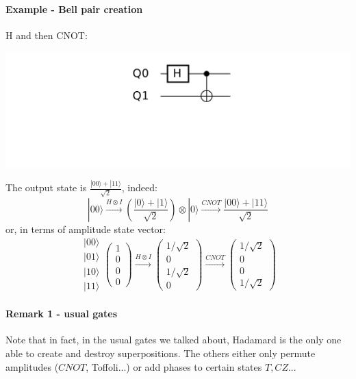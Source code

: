 \documentclass{article}
\begin{document}
\paragraph{Example - Bell pair creation} H and then CNOT:
\begin{center}
    \includegraphics[width=\textwidth]{bell_pair_creation.pdf}
\end{center}
The output state is $\frac{|00\rangle+|11\rangle}{\sqrt{2}}$, indeed:
$$|00\rangle \xrightarrow[]{H\otimes I} \left(\frac{|0\rangle+|1\rangle}{\sqrt{2}}\right)\otimes |0\rangle 
\xrightarrow[]{CNOT}\frac{|00\rangle+|11\rangle}{\sqrt{2}}$$
or, in terms of amplitude state vector:
$$ \begin{matrix}
|00\rangle \\ |01\rangle \\ |10\rangle \\ |11\rangle
\end{matrix}\begin{pmatrix}1 \\ 0 \\ 0 \\ 0\end{pmatrix} \xrightarrow[]{H\otimes I} \begin{pmatrix} 1/\sqrt{2} \\ 0 \\ 1/\sqrt{2} \\ 0 \end{pmatrix}
\xrightarrow[]{CNOT} \begin{pmatrix}
1/\sqrt{2} \\ 0 \\ 0 \\ 1/\sqrt{2}   
\end{pmatrix}$$

\paragraph{Remark 1 - usual gates} Note that in fact, in the usual gates we talked about,
Hadamard is the only one able to create and destroy superpositions. The others either
    only permute amplitudes ($CNOT$, Toffoli...) or add phases to certain states 
    $T, CZ$...
\end{document}
